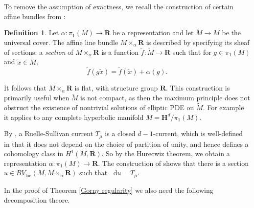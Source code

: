 \documentclass[reqno,10pt]{amsart}
\newcommand{\RR}{\mathbf{R}}
\newcommand{\Hyp}{\mathbf H}
\newcommand*\dif{\mathop{}\!\mathrm{d}}
\newcommand{\dfn}[1]{\emph{#1}\index{#1}}
\newcommand{\loc}{\mathrm{loc}}
\theoremstyle{definition}
\newtheorem{definition}[theorem]{Definition}
\numberwithin{equation}{section}
\begin{document}
To remove the assumption of exactness, we recall the construction of certain affine bundles from \cite[\S2.1]{daskalopoulos2020transverse}:

\begin{definition}
Let $\alpha: \pi_1(M) \to \RR$ be a representation and let $\tilde M \to M$ be the universal cover.
The affine line bundle $M \times_\alpha \RR$ is described by specifying its sheaf of sections: a \dfn{section} of $M \times_\alpha \RR$ is a function $\tilde f: \tilde M \to \RR$ such that for $g \in \pi_1(M)$ and $\tilde x \in \tilde M$,
$$\tilde f(g\tilde x) = \tilde f(\tilde x) + \alpha(g).$$ 
\end{definition}

It follows that $M \times_\alpha \RR$ is flat, with structure group $\RR$.
This construction is primarily useful when $\tilde M$ is not compact, as then the maximum principle does not obstruct the existence of nontrivial solutions of elliptic PDE on $\tilde M$.
For example it applies to any complete hyperbolic manifold $M = \Hyp^d/\pi_1(M)$.

By \cite{Ruelle75}, a Ruelle-Sullivan current $T_\mu$ is a closed $d-1$-current, which is well-defined in that it does not depend on the choice of partition of unity, and hence defines a cohomology class in $H^1(M, \RR)$. So by the Hurecwiz theorem, we obtain a representation $\alpha: \pi_1(M) \to \RR$.
The construction of \cite[Theorem 8.3]{daskalopoulos2020transverse} shows that there is a section $u \in BV_\loc(M, M \times_\alpha \RR)$ such that $\dif u = T_\mu$.

In the proof of Theorem \ref{Gorny regularity} we also need the following decomposition theore. 
\end{document}
